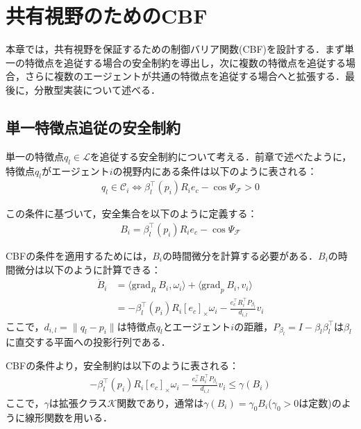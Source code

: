 \section{共有視野のためのCBF}

本章では，共有視野を保証するための制御バリア関数(CBF)を設計する．まず単一の特徴点を追従する場合の安全制約を導出し，次に複数の特徴点を追従する場合，さらに複数のエージェントが共通の特徴点を追従する場合へと拡張する．最後に，分散型実装について述べる．

\subsection{単一特徴点追従の安全制約}

単一の特徴点$q_l \in \mathcal{L}$を追従する安全制約について考える．前章で述べたように，特徴点$q_l$がエージェント$i$の視野内にある条件は以下のように表される：
\begin{equation}
\begin{aligned}
q_l \in \mathcal{C}_i \iff \beta_l^{\top}(p_i)R_ie_c - \cos\Psi_\mathcal{F} > 0
\label{eq:single_fov_condition}
\end{aligned}
\end{equation}

この条件に基づいて，安全集合を以下のように定義する：
\begin{equation}
\begin{aligned}
B_i = \beta_l^{\top}(p_i)R_ie_c - \cos\Psi_\mathcal{F}
\label{eq:single_safe_set}
\end{aligned}
\end{equation}

CBFの条件を適用するためには，$B_i$の時間微分を計算する必要がある．$B_i$の時間微分は以下のように計算できる：
\begin{equation}
\begin{aligned}
\dot{B}_i &= \langle \mathrm{grad}_R\:B_i, \omega_i \rangle + \langle \mathrm{grad}_p\:B_i, v_i \rangle \\
&= -\beta_l^\top(p_i) R_i [e_c]_\times\omega_i - \frac{e_c^\top R_i^\top P_{\beta_l}}{d_{i,l}}v_i
\label{eq:single_cbf_derivative}
\end{aligned}
\end{equation}
ここで，$d_{i,l} = \|q_l-p_i\|$は特徴点$q_l$とエージェント$i$の距離，$P_{\beta_l} = I - \beta_l\beta_l^\top$は$\beta_l$に直交する平面への投影行列である．

CBFの条件より，安全制約は以下のように表される：
\begin{equation}
\begin{aligned}
-\beta_l^\top(p_i) R_i [e_c]_\times\omega_i - \frac{e_c^\top R_i^\top P_{\beta_l}}{d_{i,l}}v_i \leq \gamma (B_i)
\label{eq:single_cbf_constraint}
\end{aligned}
\end{equation}
ここで，$\gamma$は拡張クラス$\mathcal{K}$関数であり，通常は$\gamma(B_i) = \gamma_0 B_i$($\gamma_0 > 0$は定数)のように線形関数を用いる．

